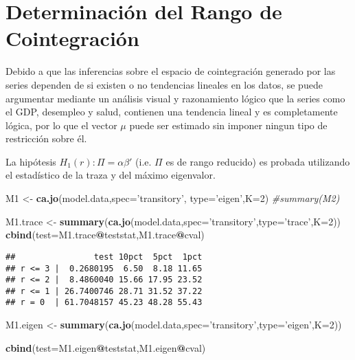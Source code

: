 \documentclass[]{book}
\newenvironment{Shaded}{\begin{snugshade}}{\end{snugshade}}
\newcommand{\KeywordTok}[1]{\textcolor[rgb]{0.13,0.29,0.53}{\textbf{#1}}}
\newcommand{\DataTypeTok}[1]{\textcolor[rgb]{0.13,0.29,0.53}{#1}}
\newcommand{\DecValTok}[1]{\textcolor[rgb]{0.00,0.00,0.81}{#1}}
\newcommand{\StringTok}[1]{\textcolor[rgb]{0.31,0.60,0.02}{#1}}
\newcommand{\CommentTok}[1]{\textcolor[rgb]{0.56,0.35,0.01}{\textit{#1}}}
\newcommand{\OperatorTok}[1]{\textcolor[rgb]{0.81,0.36,0.00}{\textbf{#1}}}
\newcommand{\NormalTok}[1]{#1}
\theoremstyle{definition}
\theoremstyle{definition}
\theoremstyle{definition}
\theoremstyle{remark}
\begin{document}
\section{Determinación del Rango de
Cointegración}\label{determinacion-del-rango-de-cointegracion}

Debido a que las inferencias sobre el espacio de cointegración generado
por las series dependen de si existen o no tendencias lineales en los
datos, se puede argumentar mediante un análisis visual y razonamiento
lógico que la series como el GDP, desempleo y salud, contienen una
tendencia lineal y es completamente lógica, por lo que el vector \(\mu\)
puede ser estimado sin imponer ningun tipo de restricción sobre él.

La hipótesis \(H_1(r) : \Pi=\alpha\beta'\) (i.e. \(\Pi\) es de rango
reducido) es probada utilizando el estadístico de la traza y del máximo
eigenvalor.

\begin{Shaded}
\begin{Highlighting}[]
\NormalTok{M1 <-}\StringTok{ }\KeywordTok{ca.jo}\NormalTok{(model.data,}\DataTypeTok{spec=}\StringTok{'transitory'}\NormalTok{, }\DataTypeTok{type=}\StringTok{'eigen'}\NormalTok{,}\DataTypeTok{K=}\DecValTok{2}\NormalTok{)}
\CommentTok{#summary(M2)}



\NormalTok{M1.trace <-}\StringTok{ }\KeywordTok{summary}\NormalTok{(}\KeywordTok{ca.jo}\NormalTok{(model.data,}\DataTypeTok{spec=}\StringTok{'transitory'}\NormalTok{,}\DataTypeTok{type=}\StringTok{'trace'}\NormalTok{,}\DataTypeTok{K=}\DecValTok{2}\NormalTok{))}
\KeywordTok{cbind}\NormalTok{(}\DataTypeTok{test=}\NormalTok{M1.trace}\OperatorTok{@}\NormalTok{teststat,M1.trace}\OperatorTok{@}\NormalTok{cval)}
\end{Highlighting}
\end{Shaded}

\begin{verbatim}
##                test 10pct  5pct  1pct
## r <= 3 |  0.2680195  6.50  8.18 11.65
## r <= 2 |  8.4860040 15.66 17.95 23.52
## r <= 1 | 26.7400746 28.71 31.52 37.22
## r = 0  | 61.7048157 45.23 48.28 55.43
\end{verbatim}

\begin{Shaded}
\begin{Highlighting}[]
\NormalTok{M1.eigen <-}\StringTok{ }\KeywordTok{summary}\NormalTok{(}\KeywordTok{ca.jo}\NormalTok{(model.data,}\DataTypeTok{spec=}\StringTok{'transitory'}\NormalTok{,}\DataTypeTok{type=}\StringTok{'eigen'}\NormalTok{,}\DataTypeTok{K=}\DecValTok{2}\NormalTok{))}

\KeywordTok{cbind}\NormalTok{(}\DataTypeTok{test=}\NormalTok{M1.eigen}\OperatorTok{@}\NormalTok{teststat,M1.eigen}\OperatorTok{@}\NormalTok{cval)}
\end{Highlighting}
\end{Shaded}
\end{document}

